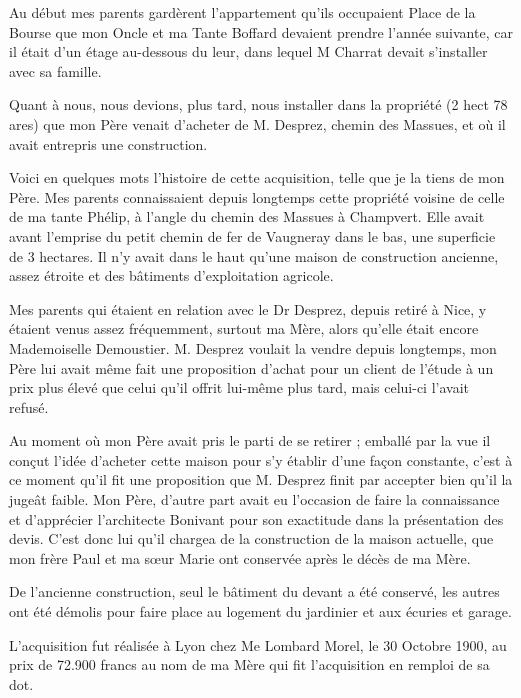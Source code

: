 \documentclass[11pt,a4paper]{report}
\begin{document}
Au début mes parents gardèrent l'appartement qu'ils occupaient Place de la Bourse que mon Oncle et ma Tante Boffard devaient prendre l'année suivante, car il était d'un étage au-dessous du leur, dans lequel M Charrat devait s'installer avec sa famille.

Quant à nous, nous devions, plus tard, nous installer dans la propriété (2 hect 78 ares) que mon Père venait d'acheter de M. Desprez, chemin des Massues, et où il avait entrepris une construction.

Voici en quelques mots l'histoire de cette acquisition, telle que je la tiens de mon Père. Mes parents connaissaient depuis longtemps cette propriété voisine de celle de ma tante Phélip, à l'angle du chemin des Massues à Champvert. Elle avait avant l'emprise du petit chemin de fer de Vaugneray dans le bas, une superficie de 3 hectares. Il n'y avait dans le haut qu'une maison de construction ancienne, assez étroite et des bâtiments d'exploitation agricole.

Mes parents qui étaient en relation avec le Dr Desprez, depuis retiré à Nice, y étaient venus assez fréquemment, surtout ma Mère, alors qu'elle était encore Mademoiselle Demoustier. M. Desprez voulait la vendre depuis longtemps, mon Père lui avait même fait une proposition d'achat pour un client de l'étude à un prix plus élevé que celui qu'il offrit lui-même plus tard, mais celui-ci l'avait refusé.

Au moment où mon Père avait pris le parti de se retirer ; emballé par la vue il conçut l'idée d'acheter cette maison pour s'y établir d'une façon constante, c'est à ce moment qu'il fit une proposition que M. Desprez finit par accepter bien qu'il la jugeât faible. Mon Père, d'autre part avait eu l'occasion de faire la connaissance et d'apprécier l'architecte Bonivant pour son exactitude dans la présentation des devis. C'est donc lui qu'il chargea de la construction de la maison actuelle, que mon frère Paul et ma sœur Marie ont conservée après le décès de ma Mère.

De l'ancienne construction, seul le bâtiment du devant a été conservé, les autres ont été démolis pour faire place au logement du jardinier et aux écuries et garage.

L'acquisition fut réalisée à Lyon chez Me Lombard Morel, le 30 Octobre 1900, au prix de 72.900 francs au nom de ma Mère qui fit l'acquisition en remploi de sa dot.
\end{document}
